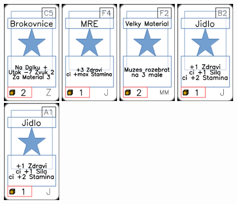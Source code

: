\documentclass[a4paper]{article}
\begin{document}
	\includegraphics[width=3.0cm]{img-1_104}
	\includegraphics[width=3.0cm]{img-1_28}
	\includegraphics[width=3.0cm]{img-1_56}
	\includegraphics[width=3.0cm]{img-1_6}
	\includegraphics[width=3.0cm]{img-1_0}
\end{document}
